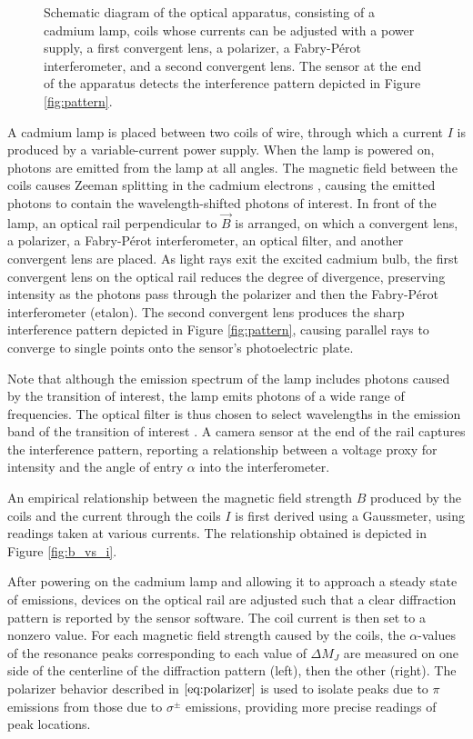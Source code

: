 \documentclass[11pt]{article}
\begin{document}
\begin{figure}[H]
  \centering
  
  \caption{Schematic diagram of the optical apparatus, consisting of a cadmium lamp, coils whose currents can be adjusted with a power supply, a first convergent lens, a polarizer, a Fabry-P\'{e}rot interferometer, and a second convergent lens. The sensor at the end of the apparatus detects the interference pattern depicted in Figure \ref{fig:pattern}.}
\end{figure}

A cadmium lamp is placed between two coils of wire, through which a current $I$ is produced by a variable-current power supply. When the lamp is powered on, photons are emitted from the lamp at all angles. The magnetic field between the coils causes Zeeman splitting in the cadmium electrons \cite{harris,griffiths_qm,qmech}, causing the emitted photons to contain the wavelength-shifted photons of interest. In front of the lamp, an optical rail perpendicular to $\vec B$ is arranged, on which a convergent lens, a polarizer, a Fabry-P\'{e}rot interferometer, an optical filter, and another convergent lens are placed. As light rays exit the excited cadmium bulb, the first convergent lens on the optical rail reduces the degree of divergence, preserving intensity as the photons pass through the polarizer and then the Fabry-P\'{e}rot interferometer (etalon). The second convergent lens produces the sharp interference pattern depicted in Figure \ref{fig:pattern}, causing parallel rays to converge to single points onto the sensor's photoelectric plate.

Note that although the emission spectrum of the lamp includes photons caused by the transition of interest, the lamp emits photons of a wide range of frequencies. The optical filter is thus chosen to select wavelengths in the emission band of the transition of interest \cite{hecht_optics}. A camera sensor at the end of the rail captures the interference pattern, reporting a relationship between a voltage proxy for intensity and the angle of entry $\alpha$ into the interferometer.

An empirical relationship between the magnetic field strength $B$ produced by the coils and the current through the coils $I$ is first derived using a Gaussmeter, using readings taken at various currents. The relationship obtained is depicted in Figure \ref{fig:b_vs_i}.

After powering on the cadmium lamp and allowing it to approach a steady state of emissions, devices on the optical rail are adjusted such that a clear diffraction pattern is reported by the sensor software. The coil current is then set to a nonzero value. For each magnetic field strength caused by the coils, the $\alpha$-values of the resonance peaks corresponding to each value of $\Delta M_J$ are measured on one side of the centerline of the diffraction pattern (left), then the other (right). The polarizer behavior described in $\eqref{eq:polarizer}$ is used to isolate peaks due to $\pi$ emissions from those due to $\sigma^{\pm}$ emissions, providing more precise readings of peak locations.
\end{document}
